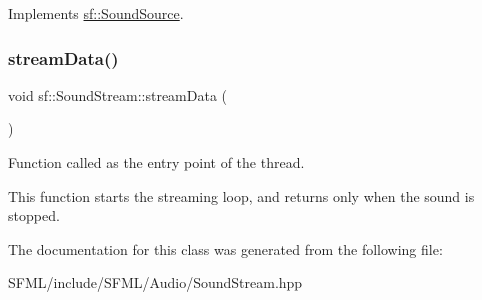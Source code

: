 Implements \mbox{\hyperlink{classsf_1_1_sound_source_a06501a25b12376befcc7ee1ed4865fda}{sf\+::\+Sound\+Source}}.

\mbox{\label{classsf_1_1_sound_stream_a08c54af1f433424ac627d1a30021f5e9}} 
\subsubsection{\texorpdfstring{streamData()}{streamData()}}
{\footnotesize\ttfamily void sf\+::\+Sound\+Stream\+::stream\+Data (\begin{DoxyParamCaption}{ }\end{DoxyParamCaption})\hspace{0.3cm}{\ttfamily [private]}}



Function called as the entry point of the thread. 

This function starts the streaming loop, and returns only when the sound is stopped. \begin{DoxyVerb}\end{DoxyVerb}
 

The documentation for this class was generated from the following file\+:\begin{DoxyCompactItemize}
\item 
S\+F\+M\+L/include/\+S\+F\+M\+L/\+Audio/Sound\+Stream.\+hpp\end{DoxyCompactItemize}
